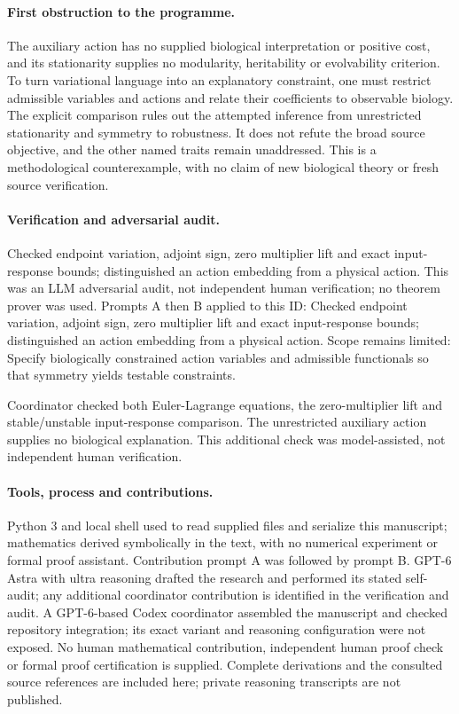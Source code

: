 \documentclass[11pt]{article}
\begin{document}
\paragraph{First obstruction to the programme.}The auxiliary action has no supplied biological interpretation or positive cost, and its stationarity supplies no modularity, heritability or evolvability criterion. To turn variational language into an explanatory constraint, one must restrict admissible variables and actions and relate their coefficients to observable biology. The explicit comparison rules out the attempted inference from unrestricted stationarity and symmetry to robustness. It does not refute the broad source objective, and the other named traits remain unaddressed. This is a methodological counterexample, with no claim of new biological theory or fresh source verification.

\paragraph{Verification and adversarial audit.}
Checked endpoint variation, adjoint sign, zero multiplier lift and exact input-response bounds; distinguished an action embedding from a physical action. This was an LLM adversarial audit, not independent human verification; no theorem prover was used. Prompts A then B applied to this ID: Checked endpoint variation, adjoint sign, zero multiplier lift and exact input-response bounds; distinguished an action embedding from a physical action. Scope remains limited: Specify biologically constrained action variables and admissible functionals so that symmetry yields testable constraints.

Coordinator checked both Euler-Lagrange equations, the zero-multiplier lift and stable/unstable input-response comparison. The unrestricted auxiliary action supplies no biological explanation. This additional check was model-assisted, not independent human verification.

\paragraph{Tools, process and contributions.}
Python 3 and local shell used to read supplied files and serialize this manuscript; mathematics derived symbolically in the text, with no numerical experiment or formal proof assistant. Contribution prompt A was followed by prompt B. GPT-6 Astra with ultra reasoning drafted the research and performed its stated self-audit; any additional coordinator contribution is identified in the verification and audit. A GPT-6-based Codex coordinator assembled the manuscript and checked repository integration; its exact variant and reasoning configuration were not exposed. No human mathematical contribution, independent human proof check or formal proof certification is supplied. Complete derivations and the consulted source references are included here; private reasoning transcripts are not published.
\end{document}
